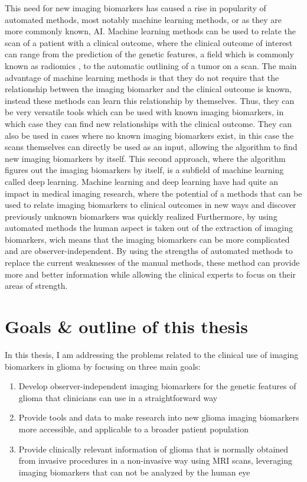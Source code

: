 This need for new imaging biomarkers has caused a rise in popularity of automated methods, most notably machine learning methods, or as they are more commonly known, \gls{AI}.
Machine learning methods can be used to relate the scan of a patient with a clinical outcome, where the clinical outcome of interest can range from the prediction of the genetic features, a field which is commonly known as radiomics \autocite{lambin2012radiomics}, to the automatic outlining of a \gls{tumor} on a scan.
The main advantage of machine learning methods is that they do not require that the relationship between the imaging biomarker and the clinical outcome is known, instead these methods can learn this relationship by themselves.
Thus, they can be very versatile tools which can be used with known imaging biomarkers, in which case they can find new relationships with the clinical outcome.
They can also be used in cases where no known imaging biomarkers exist, in this case the scans themselves can directly be used as an input, allowing the algorithm to find new imaging biomarkers by itself.
This second approach, where the algorithm figures out the imaging biomarkers by itself, is a subfield of machine learning called deep learning.
Machine learning and deep learning have had quite an impact in medical imaging research, where the potential of a methods that can be used to relate imaging biomarkers to clinical outcomes in new ways and discover previously unknown biomarkers was quickly realized \autocite{june2017deep, gillies2016radiomics}
Furthermore, by using automated methods the human aspect is taken out of the extraction of imaging biomarkers, wich means that the imaging biomarkers can be more complicated and are observer-independent.
By using the strengths of automated methods to replace the current weaknesses of the manual methods, these method can provide more and better information while allowing the clinical experts to focus on their areas of strength.


\section{Goals \& outline of this thesis}

In this thesis, I am addressing the problems related to the clinical use of imaging biomarkers in glioma by focusing on three main goals:

\begin{enumerate}
\item Develop observer-independent imaging biomarkers for the genetic features of \gls{glioma} that clinicians can use in a straightforward way
\item Provide tools and data to make research into new \gls{glioma} imaging biomarkers more accessible, and applicable to a broader patient population
\item Provide clinically relevant information of \gls{glioma} that is normally obtained from invasive procedures in a non-invasive way using \gls{MRI} scans, leveraging imaging biomarkers that can not be analyzed by the human eye
\end{enumerate}

